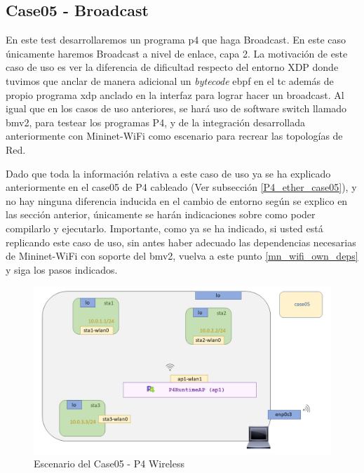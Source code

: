 \subsection{Case05 - Broadcast}
\label{p4_wifi_case05}


En este test desarrollaremos un programa p4 que haga Broadcast. En este caso únicamente haremos Broadcast a nivel de enlace, capa 2. La motivación de este caso de uso es ver la diferencia de dificultad respecto del entorno XDP donde tuvimos que anclar de manera adicional un \textit{bytecode} e\gls{bpf} en el \gls{tc} además de propio programa \gls{xdp} anclado en la interfaz para lograr hacer un broadcast. Al igual que en los casos de uso anteriores, se hará uso de software switch llamado \gls{bmv2}, para testear los programas P4, y de la integración desarrollada anteriormente con Mininet-WiFi como escenario para recrear las topologías de Red.\\
\par


Dado que toda la información relativa a este caso de uso ya se ha explicado anteriormente en el case05 de P4 cableado (Ver subsección \ref{P4_ether_case05}), y no hay ninguna diferencia inducida en el cambio de entorno según se explico en las sección anterior,  únicamente se harán indicaciones sobre como poder compilarlo y ejecutarlo. Importante, como ya se ha indicado, si usted está replicando este caso de uso, sin antes haber adecuado las dependencias necesarias de Mininet-WiFi con soporte del \gls{bmv2}, vuelva a este punto \ref{mn_wifi_own_deps} y siga los pasos indicados.

\begin{figure}[ht]
    \centering
    \includegraphics[width=16cm]{archivos/img/dev/p4-wifi/case05/scenario.png}
    \caption{Escenario del Case05 - P4 Wireless}
    \label{fig:case05_p4_wifi_scenario}
\end{figure}


